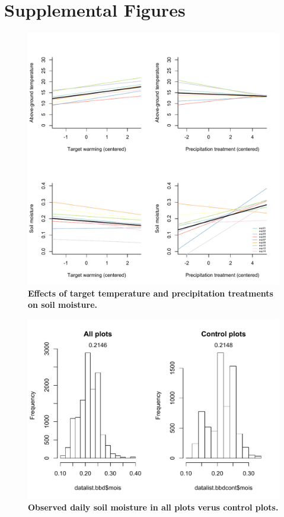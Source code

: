 \documentclass{article}
\begin{document}
\section*{Supplemental Figures}
\clearpage
 \begin{figure}[h]
\centering
 \includegraphics{../../Analyses/soilmoisture/figures/smtempvstargtemppreciptreat_lineslmerALL.pdf}
 \caption{\textbf{Effects of target temperature and precipitation treatments on soil moisture.}} 
 \label{fig:soilmois}
 \end{figure}


\begin{figure}[h]
\centering
 \includegraphics{../../Analyses/soilmoisture/figures/soilmoishist_mn.pdf}
 \caption{\textbf{Observed daily soil moisture in all plots verus control plots.}} 
 \label{fig:sm}
 \end{figure}
\end{document}
